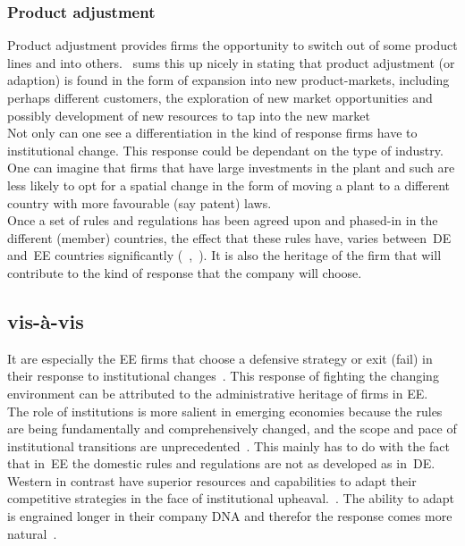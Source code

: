 \subsubsection{Product adjustment}
Product adjustment provides firms the opportunity to switch out of some product lines and into others.~\cite{Ferreira:2010tp} sums this up nicely in stating that product adjustment (or adaption) is found in the form of expansion into new product-markets, including perhaps different customers, the exploration of new market opportunities and possibly development of new resources to tap into the new market\\

Not only can one see a differentiation in the kind of response firms have to institutional change. This response could be dependant on the type of industry.
One can imagine that firms that have large investments in the plant and such are less likely to opt for a spatial change in the form of moving a plant to a different country with more favourable (say patent) laws. \\

Once a set of rules and regulations has been agreed upon and phased-in in the different (member) countries, the effect that these rules have, varies between~\gls{DE} and~\gls{EE} countries significantly (~\cite{Seligman:2008},~\cite{Shenkar:2006}). 
It is also the heritage of the firm that will contribute to the kind of response that the company will choose.~\cite{Carney:2003un}

\subsection[Developed Economies vs Emerging Economies]{ vis-à-vis }

It are especially the \gls{EE} firms that choose a defensive strategy or exit (fail) in their response to institutional changes~\cite{Chittoor:2008cj}.
This response of fighting the changing environment can be attributed to the administrative heritage of firms in \gls{EE}.~\cite{Bartlett:1989vl,Carney:2003un}\\

The role of institutions is more salient in emerging economies because the rules are being fundamentally and comprehensively changed, and the scope and pace of institutional transitions are unprecedented~\cite{Peng:2003uh}.
This mainly has to do with the fact that in~\gls{EE} the domestic rules and regulations are not as developed as in~\gls{DE}. 
Western \mne in contrast have superior resources and capabilities to adapt their competitive strategies in the face of institutional upheaval.~\cite{Chittoor:2008cj,Newman:2000fc,Prahalad:2003th}. The ability to adapt is engrained longer in their company DNA and therefor the response comes more natural~\cite{Chittoor:2009jh}.\\

